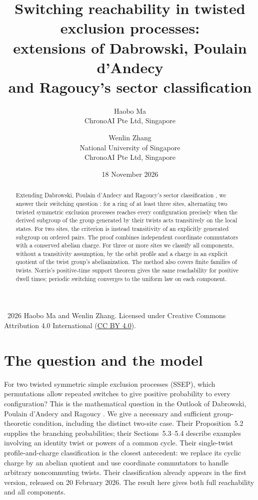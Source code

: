 \documentclass[11pt]{article}
\title{Switching reachability in twisted exclusion processes:\\extensions of Dabrowski, Poulain d'Andecy\\and Ragoucy's sector classification}
\author{Haobo Ma\\\small ChronoAI Pte Ltd, Singapore\and Wenlin Zhang\\\small National University of Singapore\\\small ChronoAI Pte Ltd, Singapore}
\date{18 November 2026}
\theoremstyle{remark}
\begin{document}
\maketitle
\begin{abstract}
Extending Dabrowski, Poulain d'Andecy and Ragoucy's sector classification
\cite[Propositions~4.9, 4.10 and 4.14, pp.~13--15; arXiv:2602.18204v2,
11 June 2026]{DPR}, we answer their switching question
\cite[Section~7, p.~22]{DPR}: for a ring of at least three sites,
alternating two twisted symmetric exclusion processes reaches every
configuration precisely when the derived subgroup of the group generated by
their twists acts transitively on the local states.
For two sites, the criterion is instead transitivity of an explicitly generated
subgroup on ordered pairs. The proof combines independent coordinate
commutators with a conserved abelian charge. For three or more sites we classify
all components, without a transitivity assumption, by the orbit profile and a
charge in an explicit quotient of the twist group's abelianization.
The method also covers finite families of twists. Norris's positive-time
support theorem \cite[Theorem~3.2.1, p.~111]{Norris} gives the same
reachability for positive dwell times; periodic switching converges to the
uniform law on each component.
\end{abstract}
\noindent\small\textcopyright\ 2026 Haobo Ma and Wenlin Zhang.
Licensed under Creative Commons Attribution 4.0 International
(\href{https://creativecommons.org/licenses/by/4.0/}{CC BY 4.0}).\normalsize

\section{The question and the model}
For two twisted symmetric simple exclusion processes (SSEP), which permutations
allow repeated switches to give positive probability to every configuration?
This is the mathematical question in the Outlook of
Dabrowski, Poulain d'Andecy and Ragoucy \cite{DPR}. We give a necessary and
sufficient group-theoretic condition, including the distinct two-site case.
Their Proposition~5.2 supplies the branching probabilities; their
Sections~5.3--5.4 describe examples involving an identity twist or powers of a
common cycle. Their single-twist profile-and-charge classification
\cite[Proposition~4.9]{DPR} is the closest antecedent: we replace its cyclic
charge by an abelian quotient and use coordinate commutators to handle arbitrary
noncommuting twists. Their classification already appears in the first version,
released on 20 February 2026. The result here gives both full reachability and
all components.
\end{document}

